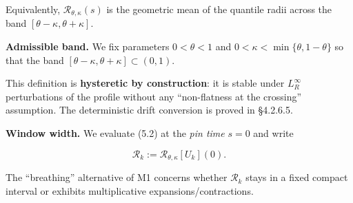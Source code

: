 \documentclass[
  11pt,
]{article}
\begin{document}
Equivalently, \(\mathcal R_{\theta,\kappa}(s)\) is the geometric mean of the quantile radii across the band \([\theta-\kappa,\theta+\kappa]\).

\textbf{Admissible band.} We fix parameters \(0<\theta<1\) and \(0<\kappa<\min\{\theta,1-\theta\}\) so that the band \([\theta-\kappa,\theta+\kappa]\subset(0,1)\).

This definition is \textbf{hysteretic by construction}: it is stable under \(L^\infty_R\) perturbations of the profile without any ``non-flatness at the crossing'' assumption. The deterministic drift conversion is proved in §4.2.6.5.

\textbf{Window width.} We evaluate (5.2) at the \emph{pin time} \(s=0\) and write

\begin{equation}
\mathcal R_k:=\mathcal R_{\theta,\kappa}[U_k](0).
 \tag{5.3}
\end{equation}

The ``breathing'' alternative of M1 concerns whether \(\mathcal R_k\) stays in a fixed compact interval or exhibits multiplicative expansions/contractions.
\end{document}
